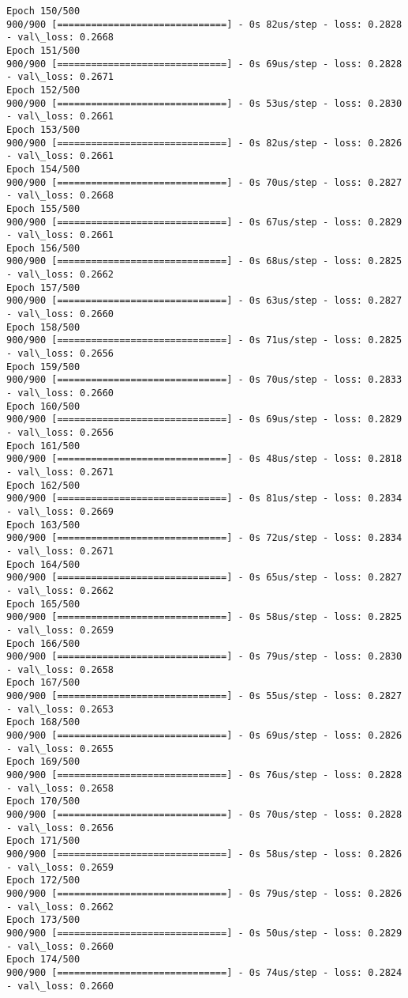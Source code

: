 \documentclass[11pt]{article}
\begin{document}
\begin{Verbatim}[commandchars=\\\{\}]
Epoch 150/500
900/900 [==============================] - 0s 82us/step - loss: 0.2828 - val\_loss: 0.2668
Epoch 151/500
900/900 [==============================] - 0s 69us/step - loss: 0.2828 - val\_loss: 0.2671
Epoch 152/500
900/900 [==============================] - 0s 53us/step - loss: 0.2830 - val\_loss: 0.2661
Epoch 153/500
900/900 [==============================] - 0s 82us/step - loss: 0.2826 - val\_loss: 0.2661
Epoch 154/500
900/900 [==============================] - 0s 70us/step - loss: 0.2827 - val\_loss: 0.2668
Epoch 155/500
900/900 [==============================] - 0s 67us/step - loss: 0.2829 - val\_loss: 0.2661
Epoch 156/500
900/900 [==============================] - 0s 68us/step - loss: 0.2825 - val\_loss: 0.2662
Epoch 157/500
900/900 [==============================] - 0s 63us/step - loss: 0.2827 - val\_loss: 0.2660
Epoch 158/500
900/900 [==============================] - 0s 71us/step - loss: 0.2825 - val\_loss: 0.2656
Epoch 159/500
900/900 [==============================] - 0s 70us/step - loss: 0.2833 - val\_loss: 0.2660
Epoch 160/500
900/900 [==============================] - 0s 69us/step - loss: 0.2829 - val\_loss: 0.2656
Epoch 161/500
900/900 [==============================] - 0s 48us/step - loss: 0.2818 - val\_loss: 0.2671
Epoch 162/500
900/900 [==============================] - 0s 81us/step - loss: 0.2834 - val\_loss: 0.2669
Epoch 163/500
900/900 [==============================] - 0s 72us/step - loss: 0.2834 - val\_loss: 0.2671
Epoch 164/500
900/900 [==============================] - 0s 65us/step - loss: 0.2827 - val\_loss: 0.2662
Epoch 165/500
900/900 [==============================] - 0s 58us/step - loss: 0.2825 - val\_loss: 0.2659
Epoch 166/500
900/900 [==============================] - 0s 79us/step - loss: 0.2830 - val\_loss: 0.2658
Epoch 167/500
900/900 [==============================] - 0s 55us/step - loss: 0.2827 - val\_loss: 0.2653
Epoch 168/500
900/900 [==============================] - 0s 69us/step - loss: 0.2826 - val\_loss: 0.2655
Epoch 169/500
900/900 [==============================] - 0s 76us/step - loss: 0.2828 - val\_loss: 0.2658
Epoch 170/500
900/900 [==============================] - 0s 70us/step - loss: 0.2828 - val\_loss: 0.2656
Epoch 171/500
900/900 [==============================] - 0s 58us/step - loss: 0.2826 - val\_loss: 0.2659
Epoch 172/500
900/900 [==============================] - 0s 79us/step - loss: 0.2826 - val\_loss: 0.2662
Epoch 173/500
900/900 [==============================] - 0s 50us/step - loss: 0.2829 - val\_loss: 0.2660
Epoch 174/500
900/900 [==============================] - 0s 74us/step - loss: 0.2824 - val\_loss: 0.2660

\end{Verbatim}
\end{document}
